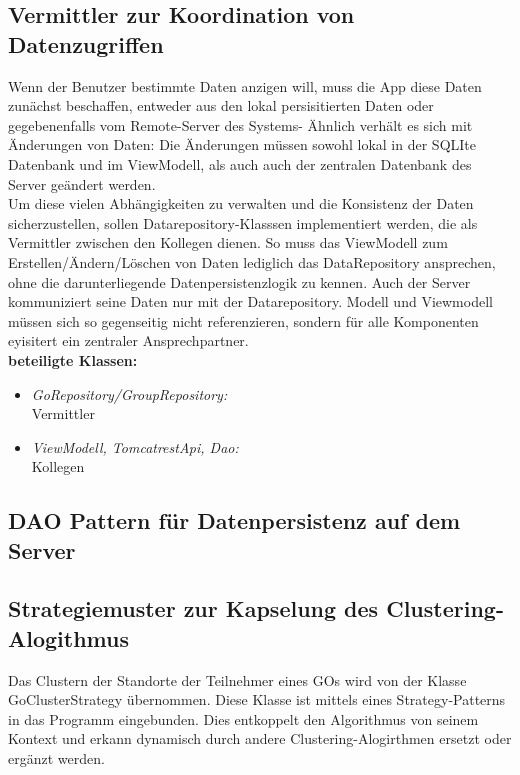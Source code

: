 \documentclass[11pt,a4paper]{report}
\begin{document}
\subsection{Vermittler zur Koordination von Datenzugriffen}\label{Vermittler}
Wenn der Benutzer bestimmte Daten anzigen will, muss die App diese Daten zunächst beschaffen, entweder aus den lokal persisitierten Daten oder gegebenenfalls vom Remote-Server des Systems- Ähnlich verhält es sich mit Änderungen von Daten: Die Änderungen müssen sowohl lokal in der SQLIte Datenbank und im ViewModell, als auch auch der zentralen Datenbank des Server geändert werden.\\
Um diese vielen Abhängigkeiten zu verwalten und die Konsistenz der Daten sicherzustellen, sollen Datarepository-Klasssen implementiert werden, die als Vermittler zwischen den Kollegen dienen.
So muss das ViewModell zum Erstellen/Ändern/Löschen von Daten lediglich das DataRepository ansprechen, ohne die darunterliegende Datenpersistenzlogik zu kennen. Auch der Server kommuniziert seine Daten nur mit der Datarepository. Modell und Viewmodell müssen sich so gegenseitig nicht referenzieren, sondern für alle Komponenten eyisitert ein zentraler Ansprechpartner.\\

\textbf{beteiligte Klassen:}
\begin{itemize}
	\item \textit{GoRepository/GroupRepository:}\\
	 Vermittler
	\item \textit{ViewModell, TomcatrestApi, Dao:}\\ Kollegen
\end{itemize}

\subsection{DAO Pattern für Datenpersistenz auf dem Server}

\subsection{Strategiemuster zur Kapselung des Clustering-Alogithmus}
Das Clustern der Standorte der Teilnehmer eines GOs wird von der Klasse GoClusterStrategy übernommen. Diese Klasse ist mittels eines Strategy-Patterns in das Programm eingebunden. Dies entkoppelt den Algorithmus von seinem Kontext und erkann dynamisch durch andere Clustering-Alogirthmen ersetzt oder ergänzt werden. \\
\end{document}
